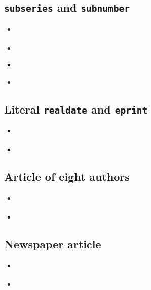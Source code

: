 \documentclass[a4paper,12pt]{scrartcl}
\newcommand{\Feld}[1]{\texttt{#1}}
\begin{document}
\subsection{\Feld{subseries} and \Feld{subnumber}}
\begin{itemize}
    \item\cite{kossack:et:al:1980}%
	\item{}%
    \item\cite{harck:1980}%
	\item{}%
\end{itemize}

\subsection{Literal \Feld{realdate} and \Feld{eprint}}
\begin{itemize}
    \item\cite{lindauer:oj}%
	\item{}%
\end{itemize}

\subsection{Article of eight authors}
\begin{itemize}
    \item\cite{summerhayes:et:al:1993}%
	\item{}%
\end{itemize}

\subsection{Newspaper article}
\begin{itemize}
    \item\cite{stafford:2004}%
	\item{}%
\end{itemize}

\printbibliography

\end{document}
